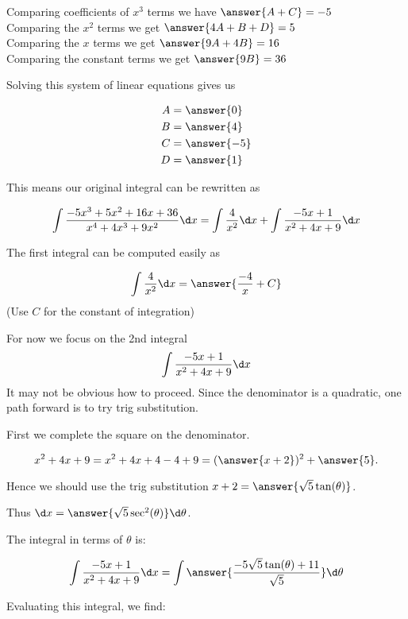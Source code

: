 \documentclass{ximera}
\begin{document}
\begin{exercise}
\begin{exercise}
\begin{exercise}
Comparing coefficients of $x^{3}$ terms we have $\answer{A+C}=-5$ \\
Comparing the $x^{2}$ terms we get $\answer {4A+B+D}=5$ \\
Comparing the $x$ terms we get $\answer{9A+4B}=16$ \\
Comparing the constant terms we get $\answer{9B}=36$ 

\begin{exercise}
Solving this system of linear equations gives us

\begin{align*}
A&=\answer{  0 }\\
B&=\answer{4   }\\
C&=\answer{  -5 }\\
D&=\answer{1    }
\end{align*}

\begin{exercise}
This means our original integral can be rewritten as 

\[
\int \frac{-5x^{3}+5x^{2}+16x+36}{x^{4}+4x^{3}+9x^{2}} \d x= \int \frac{4}{x^{2}} \d x + \int \frac{-5x+1}{x^{2}+4x+9} \d x 
\]

The first integral can be computed easily as

\[
\int \frac{4}{x^{2}} \d x=\answer{\frac{-4}{x}+C}
\]
(Use $C$ for the constant of integration)

\begin{exercise}

For now we focus on the 2nd integral 
\[
\int \frac{-5x+1}{x^{2}+4x+9} \d x 
\]
It may not be obvious how to proceed. Since the denominator is a quadratic, one path forward is to try trig substitution.

\begin{exercise}

First we complete the square on the denominator. 

\[
x^{2}+4x+9=x^{2}+4x+4-4+9=(\answer{x+2})^2+\answer{5}.
\]

Hence we should use the trig substitution $x+2=\answer{\sqrt{5}\tan(\theta)}$. 

Thus $\d x=\answer{ \sqrt{5} \sec^{2}(\theta)} \d \theta$. 

\begin{exercise}
The integral in terms of $\theta$ is:

\[
\int \frac{-5x+1}{x^{2}+4x+9} \d x =\int   \answer{\frac{-5\sqrt{5}\tan(\theta)+11}{\sqrt{5}}}  \d \theta
\]

\begin{exercise}
Evaluating this integral, we find:



\end{exercise}
\end{exercise}
\end{exercise}
\end{exercise}
\end{exercise}
\end{exercise}
\end{exercise}
\end{exercise}
\end{exercise}
\end{document}
